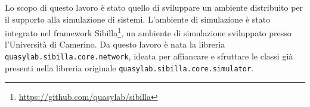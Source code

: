 Lo scopo di questo lavoro \`e stato quello di sviluppare un ambiente distribuito per il supporto alla simulazione di sistemi. L'ambiente di simulazione \`e stato integrato nel framework Sibilla\footnote{\url{https://github.com/quasylab/sibilla}}, un ambiente di simulazione sviluppato presso l'Universit\`a di Camerino.
%
Da questo lavoro è nata la libreria \texttt{quasylab.sibilla.core.network}, ideata per affiancare e sfruttare le classi già presenti nella libreria originale \texttt{quasylab.sibilla.core.simulator}.
